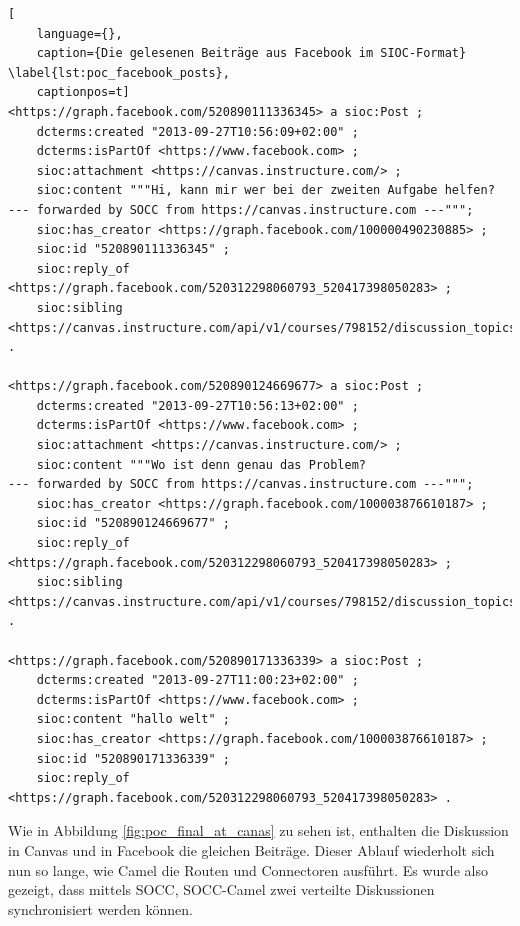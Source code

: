 \begin{lstlisting}[
    language={},
    caption={Die gelesenen Beiträge aus Facebook im SIOC-Format} \label{lst:poc_facebook_posts},
    captionpos=t]
<https://graph.facebook.com/520890111336345> a sioc:Post ;
    dcterms:created "2013-09-27T10:56:09+02:00" ;
    dcterms:isPartOf <https://www.facebook.com> ;
    sioc:attachment <https://canvas.instructure.com/> ;
    sioc:content """Hi, kann mir wer bei der zweiten Aufgabe helfen?
--- forwarded by SOCC from https://canvas.instructure.com ---""";
    sioc:has_creator <https://graph.facebook.com/100000490230885> ;
    sioc:id "520890111336345" ;
    sioc:reply_of <https://graph.facebook.com/520312298060793_520417398050283> ;
    sioc:sibling <https://canvas.instructure.com/api/v1/courses/798152/discussion_topics/1540697/entries/3284842> .

<https://graph.facebook.com/520890124669677> a sioc:Post ;
    dcterms:created "2013-09-27T10:56:13+02:00" ;
    dcterms:isPartOf <https://www.facebook.com> ;
    sioc:attachment <https://canvas.instructure.com/> ;
    sioc:content """Wo ist denn genau das Problem?
--- forwarded by SOCC from https://canvas.instructure.com ---""";
    sioc:has_creator <https://graph.facebook.com/100003876610187> ;
    sioc:id "520890124669677" ;
    sioc:reply_of <https://graph.facebook.com/520312298060793_520417398050283> ;
    sioc:sibling <https://canvas.instructure.com/api/v1/courses/798152/discussion_topics/1540697/entries/3284844> .

<https://graph.facebook.com/520890171336339> a sioc:Post ;
    dcterms:created "2013-09-27T11:00:23+02:00" ;
    dcterms:isPartOf <https://www.facebook.com> ;
    sioc:content "hallo welt" ;
    sioc:has_creator <https://graph.facebook.com/100003876610187> ;
    sioc:id "520890171336339" ;
    sioc:reply_of <https://graph.facebook.com/520312298060793_520417398050283> .
\end{lstlisting}

Wie in Abbildung \ref{fig:poc_final_at_canas} zu sehen ist, enthalten die Diskussion in Canvas und in Facebook die gleichen Beiträge. Dieser Ablauf wiederholt sich nun so lange, wie Camel die Routen und Connectoren ausführt. Es wurde also gezeigt, dass mittels SOCC, SOCC-Camel zwei verteilte Diskussionen synchronisiert werden können. 

